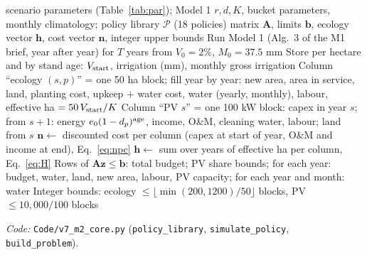 \documentclass[11pt,a4paper]{article}
\begin{document}
\begin{algorithm}[H]
\caption{Build the cohort MILP}\label{alg:build}
\begin{algorithmic}[1]
\Require scenario parameters (Table~\ref{tab:par}); Model 1 $r,d,K$, bucket parameters, monthly climatology; policy library $\mathcal P$ (18 policies)
\Ensure matrix $\bm A$, limits $\bm b$, ecology vector $\bm h$, cost vector $\bm n$, integer upper bounds
  \State Run Model 1 (Alg.~3 of the M1 brief, year after year) for $T$ years from $V_0=2\%$, $M_0=37.5$ mm
  \State Store per hectare and by stand age: $V_{\rm start}$, irrigation (mm), monthly gross irrigation
\EndFor
{}
   
    \State Column ``ecology $(s,p)$'' = one 50 ha block; fill year by year: new area, area in service,
    land, planting cost, upkeep $+$ water cost, water (yearly, monthly), labour, effective ha $=50\,V_{\rm start}/K$
  \EndFor
   
    \State Column ``PV $s$'' = one 100 kW block: capex in year $s$; from $s+1$: energy $e_0(1-d_p)^{\rm age}$, income, O\&M, cleaning water, labour; land from $s$
  \EndIf
\EndFor
\State $\bm n\gets$ discounted cost per column (capex at start of year, O\&M and income at end), Eq.~\eqref{eq:npc}
\State $\bm h\gets$ sum over years of effective ha per column, Eq.~\eqref{eq:H}
\State Rows of $\bm A\bm z\le\bm b$: total budget; PV share bounds; for each year: budget, water, land, new area, labour, PV capacity; for each year and month: water
\State Integer bounds: ecology $\le\lfloor\min(200,1200)/50\rfloor$ blocks, PV $\le10{,}000/100$ blocks
\end{algorithmic}
\end{algorithm}
\noindent\textit{Code:} \texttt{Code/v7\_m2\_core.py} (\texttt{policy\_library}, \texttt{simulate\_policy}, \texttt{build\_problem}).
\end{document}
